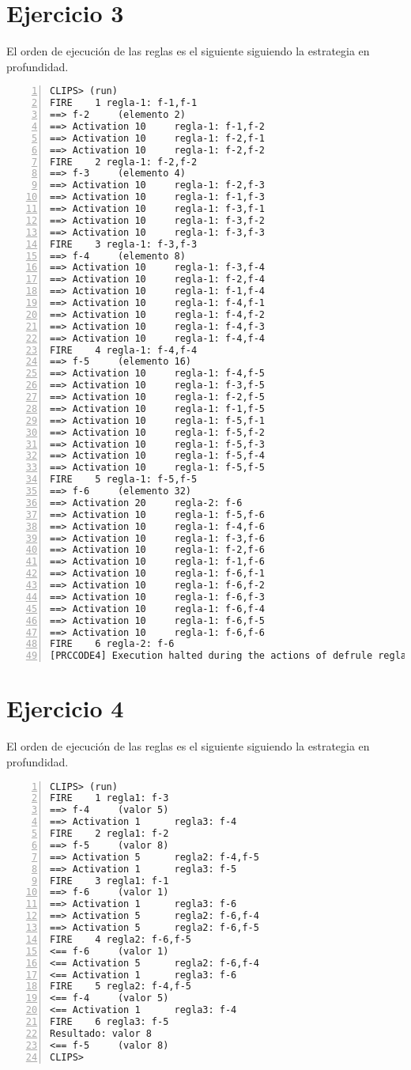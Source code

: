 \documentclass[12pt]{article}
\begin{document}
\section{Ejercicio 3}
El orden de ejecuci\'{o}n de las reglas es el siguiente siguiendo la
estrategia en profundidad.
\begin{lstlisting}[breaklines=true, 
numbers=left, showspaces=false]
CLIPS> (run)
FIRE    1 regla-1: f-1,f-1
==> f-2     (elemento 2)
==> Activation 10     regla-1: f-1,f-2
==> Activation 10     regla-1: f-2,f-1
==> Activation 10     regla-1: f-2,f-2
FIRE    2 regla-1: f-2,f-2
==> f-3     (elemento 4)
==> Activation 10     regla-1: f-2,f-3
==> Activation 10     regla-1: f-1,f-3
==> Activation 10     regla-1: f-3,f-1
==> Activation 10     regla-1: f-3,f-2
==> Activation 10     regla-1: f-3,f-3
FIRE    3 regla-1: f-3,f-3
==> f-4     (elemento 8)
==> Activation 10     regla-1: f-3,f-4
==> Activation 10     regla-1: f-2,f-4
==> Activation 10     regla-1: f-1,f-4
==> Activation 10     regla-1: f-4,f-1
==> Activation 10     regla-1: f-4,f-2
==> Activation 10     regla-1: f-4,f-3
==> Activation 10     regla-1: f-4,f-4
FIRE    4 regla-1: f-4,f-4
==> f-5     (elemento 16)
==> Activation 10     regla-1: f-4,f-5
==> Activation 10     regla-1: f-3,f-5
==> Activation 10     regla-1: f-2,f-5
==> Activation 10     regla-1: f-1,f-5
==> Activation 10     regla-1: f-5,f-1
==> Activation 10     regla-1: f-5,f-2
==> Activation 10     regla-1: f-5,f-3
==> Activation 10     regla-1: f-5,f-4
==> Activation 10     regla-1: f-5,f-5
FIRE    5 regla-1: f-5,f-5
==> f-6     (elemento 32)
==> Activation 20     regla-2: f-6
==> Activation 10     regla-1: f-5,f-6
==> Activation 10     regla-1: f-4,f-6
==> Activation 10     regla-1: f-3,f-6
==> Activation 10     regla-1: f-2,f-6
==> Activation 10     regla-1: f-1,f-6
==> Activation 10     regla-1: f-6,f-1
==> Activation 10     regla-1: f-6,f-2
==> Activation 10     regla-1: f-6,f-3
==> Activation 10     regla-1: f-6,f-4
==> Activation 10     regla-1: f-6,f-5
==> Activation 10     regla-1: f-6,f-6
FIRE    6 regla-2: f-6
[PRCCODE4] Execution halted during the actions of defrule regla-2.
\end{lstlisting}

\section{Ejercicio 4}
El orden de ejecuci\'{o}n de las reglas es el siguiente siguiendo la
estrategia en profundidad.
\begin{lstlisting}[breaklines=true, 
numbers=left, showspaces=false]
CLIPS> (run)
FIRE    1 regla1: f-3
==> f-4     (valor 5)
==> Activation 1      regla3: f-4
FIRE    2 regla1: f-2
==> f-5     (valor 8)
==> Activation 5      regla2: f-4,f-5
==> Activation 1      regla3: f-5
FIRE    3 regla1: f-1
==> f-6     (valor 1)
==> Activation 1      regla3: f-6
==> Activation 5      regla2: f-6,f-4
==> Activation 5      regla2: f-6,f-5
FIRE    4 regla2: f-6,f-5
<== f-6     (valor 1)
<== Activation 5      regla2: f-6,f-4
<== Activation 1      regla3: f-6
FIRE    5 regla2: f-4,f-5
<== f-4     (valor 5)
<== Activation 1      regla3: f-4
FIRE    6 regla3: f-5
Resultado: valor 8
<== f-5     (valor 8)
CLIPS>
\end{lstlisting}
\end{document}
